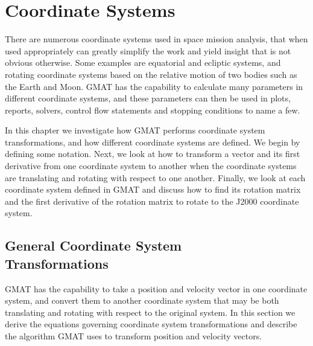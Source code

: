 \chapter{Coordinate Systems} \label{Ch:CoordinateSystems}

There are numerous coordinate systems used in space mission
analysis, that when used appropriately can greatly simplify the work
and yield insight that is not obvious otherwise.  Some examples are
equatorial and ecliptic systems, and rotating coordinate systems
based on the relative motion of two bodies such as the Earth and
Moon.  GMAT has the capability to calculate many parameters in
different coordinate systems, and these parameters can then be used
in plots, reports, solvers, control flow statements and stopping
conditions to name a few.

In this chapter we investigate how GMAT performs coordinate system
transformations, and how different coordinate systems are defined.
We begin by defining some notation.  Next, we look at how to
transform a vector and its first derivative from one coordinate
system to another when the coordinate systems are translating and
rotating with respect to one another.  Finally, we look at each
coordinate system defined in GMAT and discuss how to find its
rotation matrix and the first derivative of the rotation matrix to
rotate to the J2000 coordinate system.

\section{General Coordinate System \\ Transformations } 

GMAT has the capability to take a position and velocity vector in
one coordinate system, and convert them to another coordinate system
that may be both translating and rotating with respect to the
original system.  In this section we derive the equations governing
coordinate system transformations and describe the algorithm GMAT
uses to transform position and velocity vectors.

